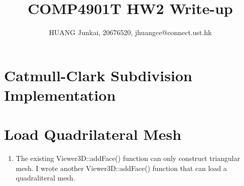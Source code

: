 \documentclass{article}
\title{COMP4901T HW2 Write-up}
\author{HUANG Junkai, 20676520, jhuangce@connect.ust.hk}
\theoremstyle{definition}
\begin{document}
\maketitle

\section{Catmull-Clark Subdivision Implementation}


\section{Load Quadrilateral Mesh}
\begin{enumerate}
    \item The existing Viewer3D::addFace() function can only construct triangular mesh. I wrote another Viewer3D::addFace() function that can load a quadraliteral mesh. 
\end{enumerate}
\end{document}
